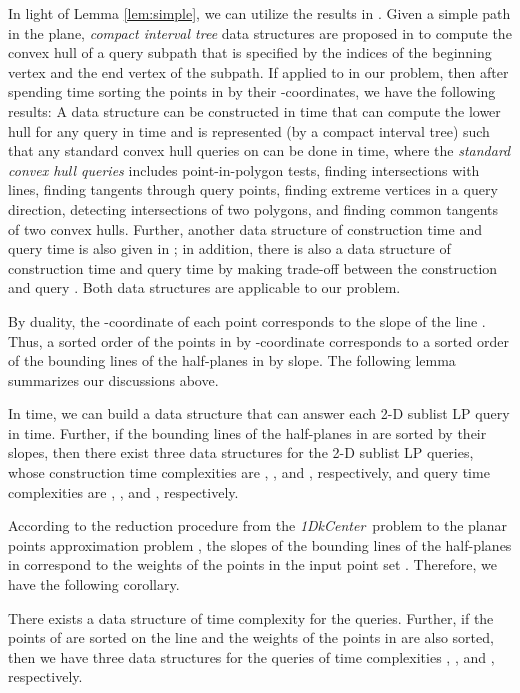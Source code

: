 \documentclass{llncs}
\def\problem{{\it 1DkCenter}}
\begin{document}
In light of Lemma \ref{lem:simple}, we can utilize the results in
\cite{ref:GuibasCo91}. Given a simple path in the plane,
{\em compact interval tree} data structures are proposed in
\cite{ref:GuibasCo91} to compute the convex hull of a query subpath
that is specified by the indices of the beginning vertex and the end
vertex of the subpath.
If applied to  in our problem, then after spending  time sorting the points in  by their -coordinates,
we have the following results: A data structure can be constructed in
 time that can compute the lower hull  for
any query  in  time and  is represented
(by a compact interval tree) such that any standard convex hull
queries on  can be done in  time, where the
{\em standard convex hull queries} includes point-in-polygon tests,
finding intersections with lines, finding tangents through query
points, finding extreme vertices in a query direction, detecting
intersections of two polygons, and finding common tangents of
two convex hulls. Further, another data structure of construction time
 and query time  is also given in
\cite{ref:GuibasCo91};  in
addition, there is also a data structure of construction time
 and query time  by making trade-off
between the construction and query \cite{ref:GuibasCo91}.
Both data structures are applicable to our problem.

By duality, the -coordinate of each point 
corresponds to the slope of the line . Thus, a sorted
order of the points in  by -coordinate corresponds to a
sorted order of the bounding lines of the half-planes in  by
slope. The following lemma summarizes our discussions above.

\begin{lemma}\label{lem:summary}
In  time, we can build a data structure that can answer
each 2-D sublist LP query in  time. Further, if the
bounding lines of the half-planes in  are sorted by their slopes,
then there exist three data structures for the 2-D sublist LP
queries, whose construction time complexities are ,
, and , respectively, and query time
complexities are , , and
, respectively.
\end{lemma}

According to the reduction procedure from the \problem\ problem to the
planar points
approximation problem \cite{ref:ChenEfkCenter11}, the slopes of the
bounding lines of the half-planes in  correspond to the weights
of the points in the input point set . Therefore, we have the following
corollary.

\begin{corollary}
There exists a data structure of time complexity  for the  queries. Further, if the points of 
are sorted on the line  and the weights of the points in 
are also sorted, then we have three data structures for the
 queries of time complexities ,
, and ,
respectively.
\end{corollary}
\end{document}
